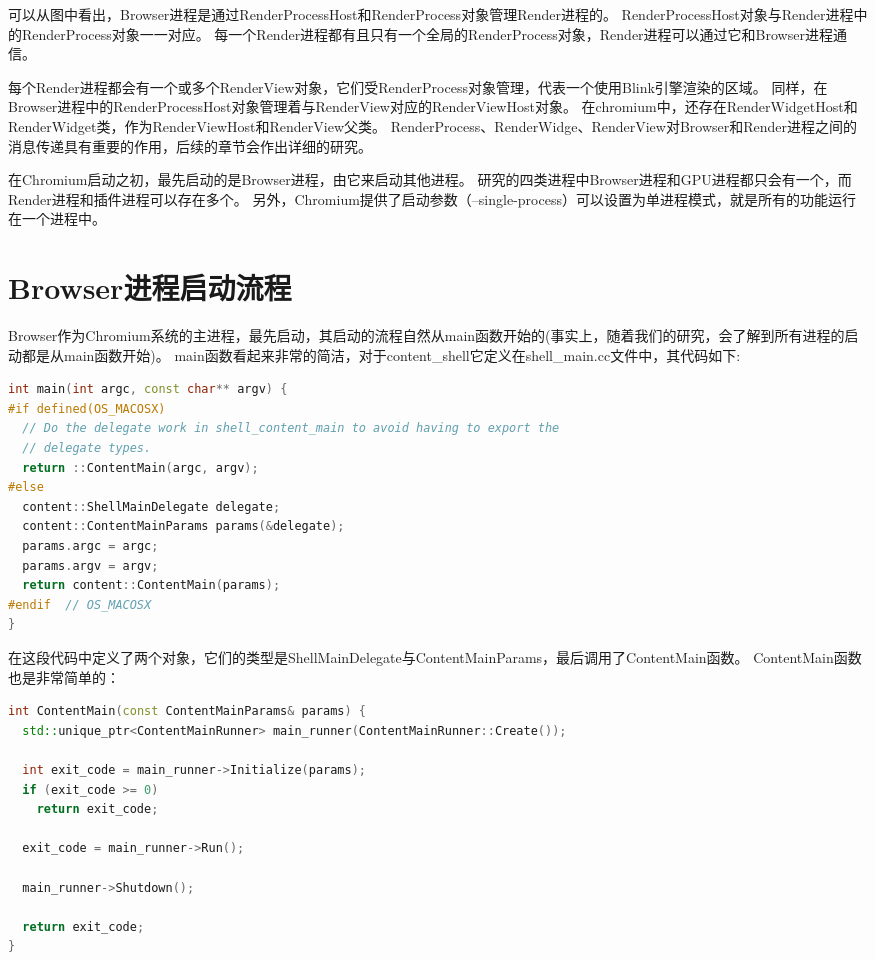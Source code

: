 可以从图中看出，Browser进程是通过RenderProcessHost和RenderProcess对象管理Render进程的。
RenderProcessHost对象与Render进程中的RenderProcess对象一一对应。
每一个Render进程都有且只有一个全局的RenderProcess对象，Render进程可以通过它和Browser进程通信。

每个Render进程都会有一个或多个RenderView对象，它们受RenderProcess对象管理，代表一个使用Blink引擎渲染的区域。
同样，在Browser进程中的RenderProcessHost对象管理着与RenderView对应的RenderViewHost对象。
在chromium中，还存在RenderWidgetHost和RenderWidget类，作为RenderViewHost和RenderView父类。
RenderProcess、RenderWidge、RenderView对Browser和Render进程之间的消息传递具有重要的作用，后续的章节会作出详细的研究。

在Chromium启动之初，最先启动的是Browser进程，由它来启动其他进程。
研究的四类进程中Browser进程和GPU进程都只会有一个，而Render进程和插件进程可以存在多个。
另外，Chromium提供了启动参数（--single-process）可以设置为单进程模式，就是所有的功能运行在一个进程中。

\section{Browser进程启动流程}
Browser作为Chromium系统的主进程，最先启动，其启动的流程自然从main函数开始的(事实上，随着我们的研究，会了解到所有进程的启动都是从main函数开始)。
main函数看起来非常的简洁，对于content\_shell它定义在shell\_main.cc文件中，其代码如下:

\begin{spacing}{1.0}
\begin{lstlisting}[language={C++}]
int main(int argc, const char** argv) {
#if defined(OS_MACOSX)
  // Do the delegate work in shell_content_main to avoid having to export the
  // delegate types.
  return ::ContentMain(argc, argv);
#else
  content::ShellMainDelegate delegate;
  content::ContentMainParams params(&delegate);
  params.argc = argc;
  params.argv = argv;
  return content::ContentMain(params);
#endif  // OS_MACOSX
}
\end{lstlisting}
\end{spacing}

在这段代码中定义了两个对象，它们的类型是ShellMainDelegate与ContentMainParams，最后调用了ContentMain函数。
ContentMain函数也是非常简单的：

\begin{spacing}{1.0}
\begin{lstlisting}[language={C++}]
int ContentMain(const ContentMainParams& params) {
  std::unique_ptr<ContentMainRunner> main_runner(ContentMainRunner::Create());

  int exit_code = main_runner->Initialize(params);
  if (exit_code >= 0)
    return exit_code;

  exit_code = main_runner->Run();

  main_runner->Shutdown();

  return exit_code;
}
\end{lstlisting}
\end{spacing}

